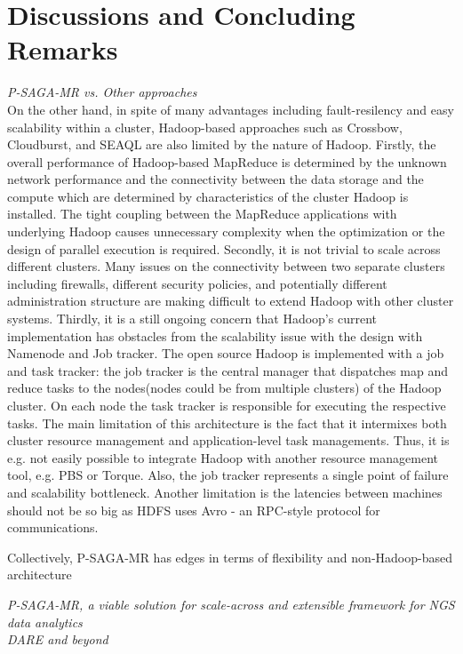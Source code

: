 \documentclass{sig-alternate}
\begin{document}
\section{Discussions and Concluding Remarks}
\textit{P-SAGA-MR vs. Other approaches}
\\

On the other hand, in spite of many advantages including fault-resilency and easy scalability within a cluster, Hadoop-based approaches such as Crossbow, Cloudburst, and SEAQL are also limited by the nature of Hadoop.  Firstly, the overall performance of Hadoop-based MapReduce is determined by the unknown network performance and the connectivity between the data storage and the compute which are determined by characteristics of the cluster Hadoop is installed.  The tight coupling between the MapReduce applications with underlying Hadoop causes unnecessary complexity when the optimization or the design of parallel execution is required.  Secondly, it is not trivial to scale across different clusters.  Many issues on the connectivity between two separate clusters including firewalls, different security policies, and potentially different administration structure are making difficult to extend Hadoop with other cluster systems.  Thirdly, it is a still ongoing concern that Hadoop's current implementation has obstacles from the scalability issue with the design with Namenode and Job tracker.   The open source Hadoop is implemented with a job and task tracker: the job tracker is the central manager that dispatches map and reduce tasks to the nodes(nodes could be from multiple clusters) of the Hadoop cluster. On each node the task tracker is responsible for executing the respective tasks. The main limitation of this architecture is the fact that it intermixes both cluster resource management and application-level task managements. Thus, it is e.g. not easily possible to integrate Hadoop with another resource management tool, e.g. PBS or Torque. Also, the job tracker represents a single point of failure and scalability bottleneck. Another limitation is the latencies between machines should not be so big as HDFS uses Avro - an RPC-style protocol for communications.

Collectively, P-SAGA-MR has edges in terms of flexibility and non-Hadoop-based architecture

\textit{P-SAGA-MR, a viable solution for scale-across and extensible framework for NGS data analytics}
\\

\textit{DARE and beyond}
\end{document}
